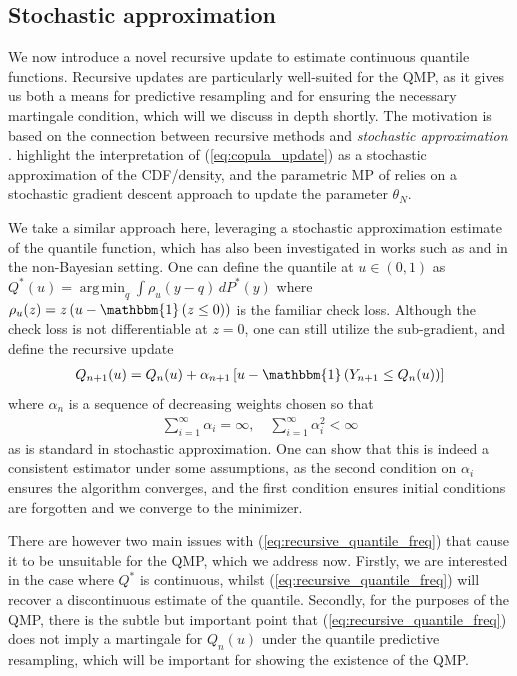 \documentclass[11pt,a4paper]{article}
\DeclareMathOperator*{\argmin}{arg\,min}
\begin{document}
\subsection{Stochastic approximation}
We now introduce a novel recursive update to estimate continuous quantile functions. Recursive updates are particularly well-suited for the QMP, as it gives us both a means for predictive resampling and for ensuring the necessary martingale condition, which will we discuss in depth shortly. The motivation is based on the connection between recursive methods and \textit{stochastic approximation} \citep{Lai2003}. \cite{Hahn2018, Fong2023a} highlight the interpretation of (\ref{eq:copula_update}) as a stochastic approximation of the CDF/density, and the parametric MP of \cite{Walker2022,Holmes2023}
relies on a stochastic gradient descent approach to update the parameter $\theta_N$.

We take a similar approach here, leveraging a stochastic approximation estimate of the quantile function, which has also been investigated in works such as \cite{Aboubacar2014,Kohler2014} and \cite{Chen2023} in the non-Bayesian setting. One can define the quantile at $u \in (0,1)$ as
 $Q^*(u) = \argmin_q \int \rho_u(y - q) \, dP^*(y)$
where $\rho_u(z) =  z\left(u - \mathbbm{1}\left(z \leq 0 \right) \right)$ is the familiar check loss. Although the check loss is not differentiable at $z = 0$, one can still utilize the sub-gradient, and define the recursive update
\begin{align}\label{eq:recursive_quantile_freq}
    Q_{n+1}(u) = Q_{n}(u) + \alpha_{n+1}\left[u - \mathbbm{1}\left(Y_{n+1} \leq Q_{n}(u)\right)\right]
\end{align}
where $\alpha_n$ is a sequence of decreasing weights chosen so that 
\begin{align}\label{eq:alpha_conditions}
    \sum_{i = 1}^\infty \alpha_i = \infty, \quad \sum_{i = 1}^\infty \alpha_i^2 < \infty
\end{align}
as is standard in stochastic approximation.
One can show that this is indeed a consistent estimator under some assumptions, as the second condition on $\alpha_i$ ensures the algorithm converges, and the first condition ensures initial conditions are forgotten and we converge to the minimizer. 

There are however two main issues with (\ref{eq:recursive_quantile_freq}) that cause it to be unsuitable for the QMP, which we address now. Firstly, we are interested in the case where $Q^*$ is continuous, whilst (\ref{eq:recursive_quantile_freq}) will recover a discontinuous estimate of the quantile. Secondly, for the purposes of the QMP, there is the subtle but important point that (\ref{eq:recursive_quantile_freq}) does not imply a martingale for $Q_n(u)$ under the quantile predictive resampling, which will be important for showing the existence of the QMP.
\end{document}
